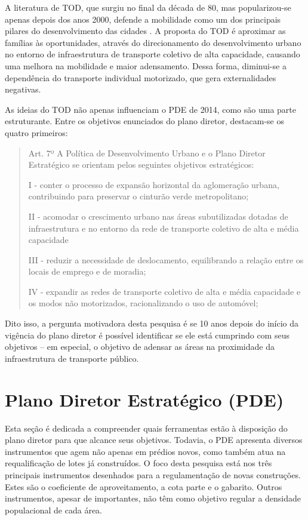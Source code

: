A literatura de TOD, que surgiu no final da década de 80, mas popularizou-se apenas depois dos anos 2000, defende a mobilidade como um dos principais pilares do desenvolvimento das cidades \cite{Ibraeva2020}. A proposta do TOD é aproximar as famílias às oportunidades, através do direcionamento do desenvolvimento urbano no entorno de infraestrutura de transporte coletivo de alta capacidade, causando uma melhora na mobilidade e maior adensamento. Dessa forma, diminui-se a dependência do transporte individual motorizado, que gera externalidades negativas.

As ideias do TOD não apenas influenciam o PDE de 2014, como são uma parte estruturante. Entre os objetivos enunciados do plano diretor, destacam-se os quatro primeiros:

{\small
\begin{quote}
    Art. 7º A Política de Desenvolvimento Urbano 
    e o Plano Diretor Estratégico se orientam pelos 
    seguintes objetivos estratégicos:

    I - conter o processo de expansão horizontal da aglomeração urbana, contribuindo para preservar o cinturão verde metropolitano;

    II - acomodar o crescimento urbano nas áreas subutilizadas dotadas de infraestrutura e no entorno da rede de transporte coletivo de alta e média capacidade

    III - reduzir a necessidade de deslocamento, equilibrando a relação entre os locais de emprego e de moradia;

    IV - expandir as redes de transporte coletivo de alta e média capacidade e os modos não motorizados, racionalizando o uso de automóvel;
\end{quote}
}
Dito isso, a pergunta motivadora desta pesquisa é se 10 anos depois do início da vigência do plano diretor é possível identificar se ele está cumprindo com seus objetivos -- em especial, o objetivo de adensar as áreas na proximidade da infraestrutura de transporte público.

\section{Plano Diretor Estratégico (PDE)}
\label{sec:plano-diretor}

Esta seção é dedicada a compreender quais ferramentas estão à disposição do plano diretor para que alcance seus objetivos. Todavia, o PDE apresenta diversos instrumentos que agem não apenas em prédios novos, como também atua na requalificação de lotes já construídos. O foco desta pesquisa está nos três principais instrumentos desenhados para a regulamentação de novas construções. Estes são o coeficiente de aproveitamento, a cota parte e o gabarito. Outros instrumentos, apesar de importantes, não têm como objetivo regular a densidade populacional de cada área. 

